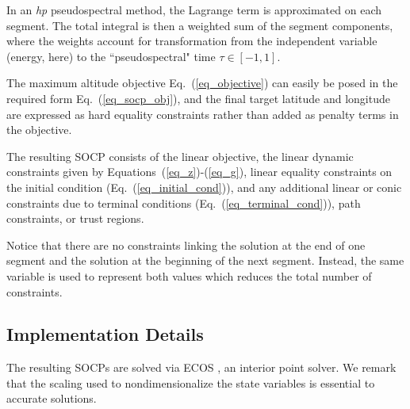 \documentclass[letterpaper, preprint, paper,11pt]{AAS}	%
\begin{document}
	In an \textit{hp} pseudospectral method, the Lagrange term is approximated on each segment. The total integral is then a weighted sum of the segment components, where the weights account for transformation from the independent variable (energy, here) to the ``pseudospectral" time $\tau\in[-1,1]$.
	
	The maximum altitude objective Eq.~(\ref{eq_objective}) can easily be posed in the required form Eq.~(\ref{eq_socp_obj}), and the final target latitude and longitude are expressed as hard equality constraints rather than added as penalty terms in the objective. 
	
	The resulting SOCP consists of the linear objective, the linear dynamic constraints given by Equations~(\ref{eq_z})-(\ref{eq_g}), linear equality constraints on the initial condition (Eq.~(\ref{eq_initial_cond})), and any additional linear or conic constraints due to terminal conditions (Eq.~(\ref{eq_terminal_cond})), path constraints, or trust regions.
	
	Notice that there are no constraints linking the solution at the end of one segment and the solution at the beginning of the next segment. Instead, the same variable is used to represent both values which reduces the total number of constraints.%
	
	\subsection{Implementation Details}
	 The resulting SOCPs are solved via ECOS \cite{ecos}, an interior point solver. We remark that the scaling used to nondimensionalize the state variables is essential to accurate solutions. 
	
\end{document}
